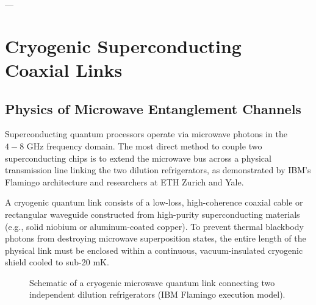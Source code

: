 ---

\section{Cryogenic Superconducting Coaxial Links}

\subsection{Physics of Microwave Entanglement Channels}
Superconducting quantum processors operate via microwave photons in the $4-8\text{ GHz}$ frequency domain. The most direct method to couple two superconducting chips is to extend the microwave bus across a physical transmission line linking the two dilution refrigerators, as demonstrated by IBM's Flamingo architecture and researchers at ETH Zurich and Yale.

A cryogenic quantum link consists of a low-loss, high-coherence coaxial cable or rectangular waveguide constructed from high-purity superconducting materials (e.g., solid niobium or aluminum-coated copper). To prevent thermal blackbody photons from destroying microwave superposition states, the entire length of the physical link must be enclosed within a continuous, vacuum-insulated cryogenic shield cooled to sub-20 mK.

\begin{figure}[htbp]
    \centering
    \caption{Schematic of a cryogenic microwave quantum link connecting two independent dilution refrigerators (IBM Flamingo execution model).}
    \label{fig:superconducting_link}
\end{figure}

